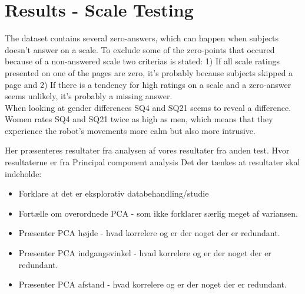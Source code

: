 \section{{\color{red}Results - Scale Testing}}
\label{ResultsScaleTesting}
%
The dataset contains several zero-answers, which can happen when subjects doesn't answer on a scale. To exclude some of the zero-points that occured because of a non-answered scale two criterias is stated: 1) If all scale ratings presented on one of the pages are zero, it's probably because subjects skipped a page and 2) If there is a tendency for high ratings on a scale and a zero-answer seems unlikely, it's probably a missing answer.\\

\noindent
When looking at gender differences SQ4 and SQ21 seems to reveal a difference. Women rates SQ4 and SQ21 twice as high as men, which means that they experience the robot's movements more calm but also more intrusive.\\

\noindent




{\color{red} Her præsenteres resultater fra analysen af vores resultater fra anden test. Hvor resultaterne er fra Principal component analysis}
%
Det der tænkes at resultater skal indeholde: 
\begin{itemize}
	\item Forklare at det er eksplorativ databehandling/studie
	\item Fortælle om overordnede PCA - som ikke forklarer særlig meget af variansen.
	\item Præsenter PCA højde - hvad korrelere og er der noget der er redundant.
	\item Præsenter PCA indgangsvinkel - hvad korrelere og er der noget der er redundant.
	\item Præsenter PCA afstand - hvad korrelere og er der noget der er redundant.
\end{itemize}